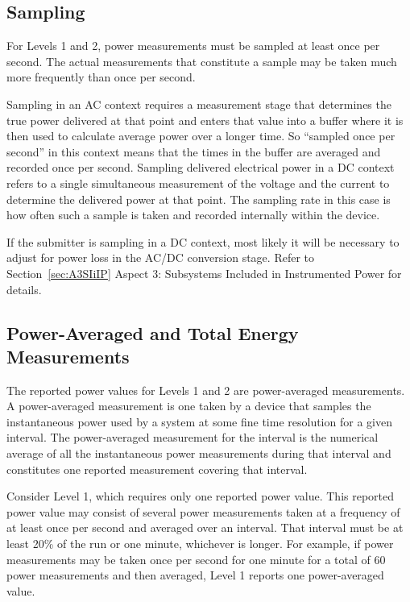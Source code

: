\subsection{Sampling}
\noindent
For Levels 1 and 2, power measurements must be sampled at least once per second. The actual measurements that constitute a sample may be taken much more frequently than once per second. 
\wl

\noindent
Sampling in an AC context requires a measurement stage that determines the true power delivered at that point and enters that value into a buffer where it is then used to calculate average power over a longer time.  So ``sampled once per second'' in this context means that the times in the buffer are averaged and recorded once per second.
Sampling delivered electrical power in a DC context refers to a single simultaneous measurement of the voltage and the current to determine the delivered power at that point.  The sampling rate in this case is how often such a sample is taken and recorded internally within the device.  
\wl

\noindent
If the submitter is sampling in a DC context, most likely it will be necessary to adjust for power loss in the AC/DC conversion stage. 
Refer to Section~\ref{sec:A3SIiIP} Aspect 3: Subsystems Included in Instrumented Power for details.

\subsection{Power-Averaged and Total Energy Measurements}
\label{sec:PAaTEM}
\noindent
The reported power values for Levels 1 and 2 are power-averaged measurements. A power-averaged measurement is one taken by a device that samples the instantaneous power used by a system at some fine time resolution for a given interval. The power-averaged measurement for the interval is the numerical average of all the instantaneous power measurements during that interval and constitutes one reported measurement covering that interval. 
\wl

\noindent
Consider Level 1, which requires only one reported power value. This reported power value may consist of several power measurements taken at a frequency of at least once per second and averaged over an interval. That interval must be at least 20\% of the run or one minute, whichever is longer. For example, if power measurements may be taken once per second for one minute for a total of 60 power measurements and then averaged, Level 1 reports one power-averaged value.
\wl

